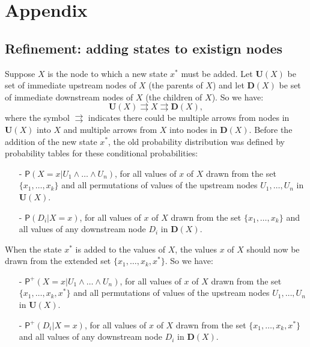 \documentclass[
  11pt,
  dvipsnames,enabledeprecatedfontcommands]{scrartcl}
\newcommand{\pr}[1]{\ensuremath{\mathsf{P}(#1)}}
\newcommand{\ppr}[2]{\ensuremath{\mathsf{P}^{#1}(#2)}}
\begin{document}
\hypertarget{appendix}{%
\section{Appendix}\label{appendix}}

\hypertarget{refinement-adding-states-to-existign-nodes}{%
\subsection{Refinement: adding states to existign
nodes}\label{refinement-adding-states-to-existign-nodes}}

Suppose \(X\) is the node to which a new state \(x^*\) must be added.
Let \(\mathbf{U}(X)\) be set of immediate upstream nodes of \(X\) (the
parents of \(X\)) and let \(\mathbf{D}(X)\) be set of immediate
downstream nodes of \(X\) (the children of \(X\)). So we have:
\[\mathbf{U}(X) \rightrightarrows  X \rightrightarrows \mathbf{D}(X),\]
\noindent where the symbol \(\rightrightarrows\) indicates there could
be multiple arrows from nodes in \(\mathbf{U}(X)\) into \(X\) and
multiple arrows from \(X\) into nodes in \(\mathbf{D}(X)\). Before the
addition of the new state \(x^*\), the old probability distribution was
defined by probability tables for these conditional probabilities:

\begin{itemize}
\item[-] $\pr{X=x \vert U_1 \wedge \dots \wedge U_n}$, for all values of $x$ of $X$
drawn from the set $\{x_1, \dots, x_k\}$ and all permutations of values of the upstream nodes $U_1, \dots, U_n$ in $\mathbf{U}(X)$.
\item[-] $\pr{D_i \vert X =x}$, for all values of $x$ of $X$
drawn from the set $\{x_1, \dots, x_k\}$ and all values of any downstream node $D_i$ in $\mathbf{D}(X)$.
\end{itemize}

\noindent When the state \(x^*\) is added to the values of \(X\), the
values \(x\) of \(X\) should now be drawn from the extended set
\(\{x_1, \dots, x_k, x^*\}\). So we have:

\begin{itemize}
\item[-] $\ppr{+}{X=x \vert U_1 \wedge \dots \wedge U_n}$, for all values of $x$ of $X$
drawn from the set $\{x_1, \dots, x_k, x^*\}$ and all permutations of values of the upstream nodes $U_1, \dots, U_n$ in $\mathbf{U}(X)$.
\item[-] $\ppr{+}{D_i \vert X =x}$, for all values of $x$ of $X$
drawn from the set $\{x_1, \dots, x_k, x^*\}$ and all values of any downstream node $D_i$ in $\mathbf{D}(X)$.
\end{itemize}
\end{document}
